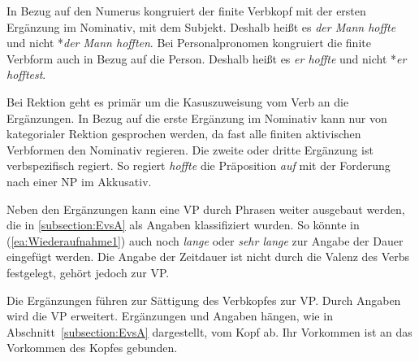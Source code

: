 In Bezug auf den Numerus kongruiert der finite Verbkopf mit der ersten Ergänzung im Nominativ, mit dem Subjekt. Deshalb heißt es \textit{der Mann hoffte} und nicht *\textit{der Mann hofften}. Bei Personalpronomen kongruiert die finite Verbform auch in Bezug auf die Person. Deshalb heißt es \textit{er hoffte} und nicht *\textit{er hofftest}.

Bei Rektion geht es primär um die Kasuszuweisung vom Verb an die Ergänzungen. In Bezug auf die erste Ergänzung im Nominativ kann nur von kategorialer Rektion gesprochen werden, da fast alle finiten aktivischen Verbformen den Nominativ regieren. Die zweite oder dritte Ergänzung ist verbspezifisch regiert. So regiert \textit{hoffte} die Präposition \textit{auf} mit der Forderung nach einer NP im Akkusativ. 

Neben den Ergänzungen kann eine VP durch Phrasen weiter ausgebaut werden, die in \ref{subsection:EvsA} als Angaben klassifiziert wurden. So könnte in (\ref{ea:Wiederaufnahme1}) auch noch \textit{lange} oder \textit{sehr lange} zur Angabe der Dauer eingefügt werden. Die Angabe der Zeitdauer ist nicht durch die Valenz des Verbs festgelegt, gehört jedoch zur VP. 

Die Ergänzungen führen zur Sättigung des Verbkopfes zur VP. Durch Angaben wird die VP erweitert. Ergänzungen und Angaben hängen, wie in Abschnitt~\ref{subsection:EvsA} dargestellt, vom Kopf ab. Ihr Vorkommen ist an das Vorkommen des Kopfes gebunden. 

